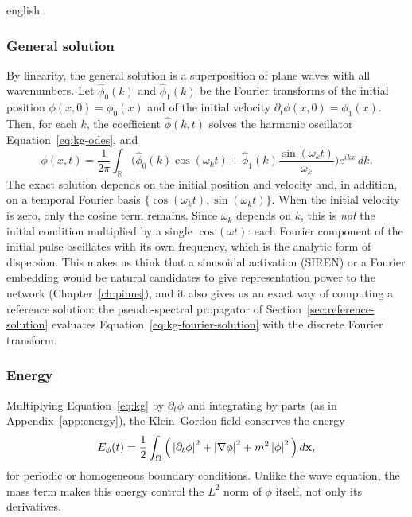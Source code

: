 \documentclass[0000.tex]{subfiles}
\begin{document}
\begin{hyphenrules}{english}
\subsubsection{General solution}
By linearity, the general solution is a superposition of plane waves with all wavenumbers. Let
$\hat\phi_0(k)$ and $\hat\phi_1(k)$ be the Fourier transforms of the initial position
$\phi(x,0)=\phi_0(x)$ and of the initial velocity $\partial_t\phi(x,0)=\phi_1(x)$. Then, for each $k$,
the coefficient $\hat\phi(k,t)$ solves the harmonic oscillator Equation~\eqref{eq:kg-odes}, and
\begin{equation}
  \phi(x,t)=\frac{1}{2\pi}\int_{\mathbb{R}}\Big(\hat\phi_0(k)\cos(\omega_kt)
  +\hat\phi_1(k)\frac{\sin(\omega_kt)}{\omega_k}\Big)e^{ikx}\,d k.
  \label{eq:kg-fourier-solution}
\end{equation}
The exact solution depends on the initial position and velocity and, in addition, on a temporal
Fourier basis $\{\cos(\omega_kt),\sin(\omega_kt)\}$. When the initial velocity is zero, only the cosine
term remains. Since $\omega_k$ depends on $k$, this is \emph{not} the initial condition multiplied by a
single $\cos(\omega t)$: each Fourier component of the initial pulse oscillates with its own frequency,
which is the analytic form of dispersion. This makes us think that a sinusoidal activation (SIREN) or a
Fourier embedding would be natural candidates to give representation power to the network
(Chapter~\ref{ch:pinns}), and it also gives us an exact way of computing a reference solution: the
pseudo-spectral propagator of Section~\ref{sec:reference-solution} evaluates
Equation~\eqref{eq:kg-fourier-solution} with the discrete Fourier transform.

\subsubsection{Energy}
Multiplying Equation~\eqref{eq:kg} by $\partial_t\phi$ and integrating by parts (as in Appendix~\ref{app:energy}), the
Klein--Gordon field conserves the energy
\begin{equation}
  E_\phi(t)=\frac12\int_\Omega\Big(\left\lvert \partial_t\phi \right\rvert^2+\left\lvert \nabla\phi \right\rvert^2+m^2\left\lvert \phi \right\rvert^2\Big)\,d\mathbf{x},
  \label{eq:kg-energy}
\end{equation}
for periodic or homogeneous boundary conditions. Unlike the wave equation, the mass term makes this
energy control the $L^2$ norm of $\phi$ itself, not only its derivatives.


\end{hyphenrules}
\end{document}
